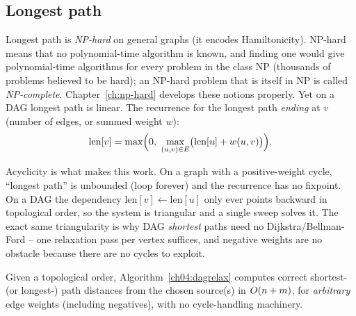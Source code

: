 \subsection{Longest path}

Longest path is \emph{NP-hard} on general graphs (it encodes Hamiltonicity). NP-hard means that no polynomial-time algorithm is known, and finding one would give polynomial-time algorithms for every problem in the class NP (thousands of problems believed to be hard); an NP-hard problem that is itself in NP is called \emph{NP-complete}. Chapter~\ref{ch:np-hard} develops these notions properly. Yet on a DAG longest path is linear. The
recurrence for the longest path \emph{ending} at $v$ (number of edges, or summed weight $w$):
\[
  \mathrm{len}[v]=\max\Bigl(0,\ \max_{(u,v)\in E}\bigl(\mathrm{len}[u]+w(u,v)\bigr)\Bigr).
\]

\begin{whybox}
Acyclicity is what makes this work. On a graph with a positive-weight cycle, ``longest path'' is
unbounded (loop forever) and the recurrence has no fixpoint. On a DAG the dependency
$\mathrm{len}[v]\leftarrow\mathrm{len}[u]$ only ever points backward in topological order, so the
system is triangular and a single sweep solves it. The exact same triangularity is why DAG
\emph{shortest} paths need no Dijkstra/Bellman-Ford -- one relaxation pass per vertex suffices, and
negative weights are no obstacle because there are no cycles to exploit.
\end{whybox}

\begin{algorithm}[H]
\DontPrintSemicolon
{}
\caption{\textsc{DAGRelax}$(\Gph,w)$}\label{ch04:dagrelax}
\end{algorithm}

\begin{theorem}\label{ch04:dag-sssp}
Given a topological order, Algorithm~\ref{ch04:dagrelax} computes correct shortest- (or longest-) path
distances from the chosen source(s) in $O(n+m)$, for \emph{arbitrary} edge weights (including
negatives), with no cycle-handling machinery.
\end{theorem}


